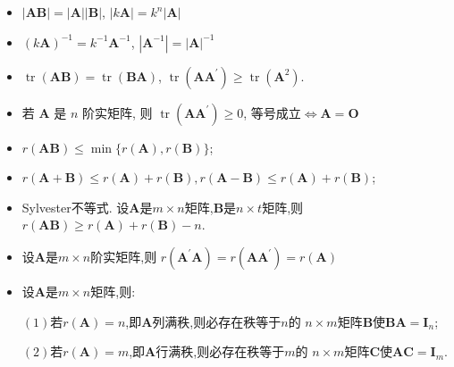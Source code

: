\documentclass[UTF8]{ctexart}
\begin{document}
\begin{itemize}

\item $|\boldsymbol{A B}|=|\boldsymbol{A}||\boldsymbol{B}|$, $|k\boldsymbol{A}|=k^n|\boldsymbol{A}|$

\item $(k \boldsymbol{A})^{-1}=k^{-1} \boldsymbol{A}^{-1}$, $|\boldsymbol{A}^{-1}|=|\boldsymbol{A}|^{-1}$

\item $\operatorname{tr}(\boldsymbol{A} \boldsymbol{B})=
\operatorname{tr}(\boldsymbol{B} \boldsymbol{A})$,
$\operatorname{tr}\left(\boldsymbol{A} \boldsymbol{A}^{\prime}\right)
\geq \operatorname{tr}\left(\boldsymbol{A}^2 \right)$.

\item 若 $\boldsymbol{A}$ 是 $n$ 阶实矩阵, 
则 $\operatorname{tr}\left(\boldsymbol{A} \boldsymbol{A}^{\prime}\right) \geq 0$,
等号成立$\Leftrightarrow\boldsymbol{A}=\boldsymbol{O}$\par

\item $r(\boldsymbol{A} \boldsymbol{B}) \leq \min \{r(\boldsymbol{A}), r(\boldsymbol{B})\}$;\par

\item $r(\boldsymbol{A}+\boldsymbol{B}) \leq r(\boldsymbol{A})+r(\boldsymbol{B}), 
r(\boldsymbol{A}-\boldsymbol{B}) \leq r(\boldsymbol{A})+r(\boldsymbol{B})$;\par

\item Sylvester不等式.
设$\boldsymbol{A}$是$m\times n$矩阵,$\boldsymbol{B}$是$n\times t$矩阵,则
$r(\boldsymbol{A} \boldsymbol{B}) \geq r(\boldsymbol{A})+r(\boldsymbol{B})-n$.

\item 设$\boldsymbol{A}$是$m\times n$阶实矩阵,则
$r\left(\boldsymbol{A}^{\prime} \boldsymbol{A}\right)=
r\left(\boldsymbol{A} \boldsymbol{A}^{\prime}\right)=r(\boldsymbol{A})$

\item 设$\boldsymbol{A}$是$m\times n$矩阵,则:\par
$(1)$若$r(\boldsymbol{A})=n$,即$\boldsymbol{A}$列满秩,则必存在秩等于$n$的
$n\times m$矩阵$\boldsymbol{B}$使$\boldsymbol{B}\boldsymbol{A}=\boldsymbol{I}_{n}$;\par
$(2)$若$r(\boldsymbol{A})=m$,即$\boldsymbol{A}$行满秩,则必存在秩等于$m$的
$n\times m$矩阵$\boldsymbol{C}$使$\boldsymbol{AC}=\boldsymbol{I}_{m}$.


\end{itemize}
\end{document}
